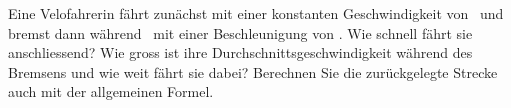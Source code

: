 Eine Velofahrerin fährt zunächst mit einer konstanten Geschwindigkeit von \vVaO\ und bremst dann während \tVbO\ mit einer Beschleunigung von \aVbO. Wie schnell fährt sie anschliessend? Wie gross ist ihre Durchschnittsgeschwindigkeit während des Bremsens und wie weit fährt sie dabei? Berechnen Sie die zurückgelegte Strecke auch mit der allgemeinen Formel.
